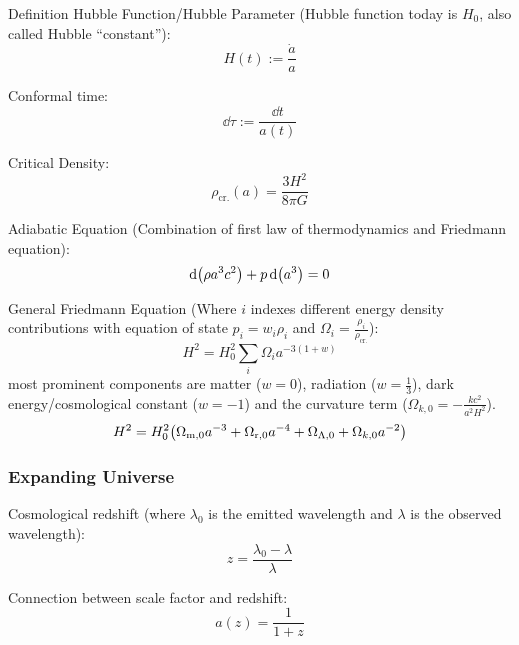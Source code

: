 			\noindent
			Definition Hubble Function/Hubble Parameter{} (Hubble function today is $H_0$, also called Hubble ``constant''):
			\begin{equation}
				H(t) := \frac{\dot{a}}{a}
			\end{equation}

			\noindent
			Conformal time:
			\begin{equation}
				\dd \tau := \frac{\dd t}{a(t)}
			\end{equation}

			\noindent
			Critical Density:
			\begin{equation}
				\rho_\text{cr.} (a) = \frac{3 H^2}{8 \pi G}
			\end{equation}

			\noindent
			Adiabatic Equation (Combination of first law of thermodynamics and Friedmann equation):
			\begin{equation}
				\dd \qty(\rho a^3 c^2) + p \dd (a^3) = 0
			\end{equation}

			\noindent
			General Friedmann Equation (Where $i$ indexes different energy density contributions with equation of state $p_i = w_i \rho_i$ and $\Omega_i = \frac{\rho_i}{\rho_\text{cr.}}$):
			\begin{equation}
				H^2 = H_0^2\sum_i \Omega_i a^{-3(1+w)}
			\end{equation}
			most prominent components are matter ($w=0$), radiation ($w=\frac{1}{3}$), dark energy/cosmological constant ($w=-1$) and the curvature term ($\Omega_{k,0}=-\frac{k c^2}{a^2 H^2}$).
			\begin{equation}
				H^2 = H_0^2 \qty(\Omega_{\text{m},0} a^{-3} + \Omega_{\text{r},0} a^{-4} + \Omega_{\Lambda,0} + \Omega_{k,0} a^{-2})				
			\end{equation}


		\subsubsection{Expanding Universe}
			Cosmological redshift (where $\lambda_0$ is the emitted wavelength and $\lambda$ is the observed wavelength):
			\begin{equation}
				z = \frac{\lambda_0 - \lambda}{\lambda}
			\end{equation}

			\noindent
			Connection between scale factor and redshift:
			\begin{equation}
				a(z) = \frac{1}{1+z}
			\end{equation}